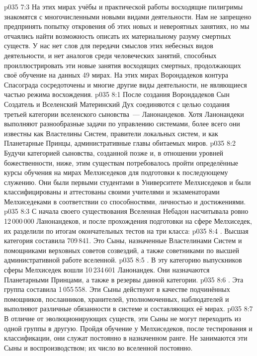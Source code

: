 \vs p035 7:3 На этих мирах учёбы и практической работы восходящие пилигримы знакомятся с многочисленными новыми видами деятельности. Нам не запрещено предпринять попытку откровения об этих новых и невероятных занятиях, но мы отчаялись найти возможность описать их материальному разуму смертных существ. У нас нет слов для передачи смыслов этих небесных видов деятельности, и нет аналогов среди человеческих занятий, способных проиллюстрировать эти новые занятия восходящих смертных, продолжающих своё обучение на данных 49 мирах. На этих мирах Ворондадеков контура Спасограда сосредоточены и многие другие виды деятельности, не являющиеся частью режима восхождения.
\vs p035 8:1 После создания Ворондадеков Сын Создатель и Вселенский Материнский Дух соединяются с целью создания третьей категории вселенского сыновства~--- Ланонандеков. Хотя Ланонандеки выполняют разнообразные задачи по управлению системами, более всего они известны как Властелины Систем, правители локальных систем, и как Планетарные Принцы, административные главы обитаемых миров.
\vs p035 8:2 Будучи категорией сыновства, созданной позже и, в отношении уровней божественности, ниже, этим существам потребовалось пройти определённые курсы обучения на мирах Мелхиседеков для подготовки к последующему служению. Они были первыми студентами в Университете Мелхиседеков и были классифицированы и аттестованы своими учителями и экзаменаторами Мелхиседеками в соответствии со способностями, личностью и достижениями.
\vs p035 8:3 С начала своего существования Вселенная Небадон насчитывала ровно 12\,000\,000 Ланонандеков, и после прохождения подготовки на сфере Мелхиседек, их разделили по итогам окончательных тестов на три класса:
\vs p035 8:4 . Высшая категория составила 709\,841. Это Сыны, назначенные Властелинами Систем и помощниками верховных советов созвездий, а также советниками по высшей административной работе вселенной.
\vs p035 8:5 . В эту категорию выпускников сферы Мелхиседек вошли 10\,234\,601 Ланонандек. Они назначаются Планетарными Принцами, а также в резервы данной категории.
\vs p035 8:6 . Эта группа составила 1\,055\,558. Эти Сыны действуют в качестве подчинённых помощников, посланников, хранителей, уполномоченных, наблюдателей и выполняют различные обязанности в системе и составляющих её мирах.
\vs p035 8:7 \pc В отличие от эволюционирующих существ, эти Сыны не могут переходить из одной группы в другую. Пройдя обучение у Мелхиседеков, после тестирования и классификации, они служат постоянно в назначенном ранге. Не занимаются эти Сыны и воспроизводством; их число во вселенной постоянно.
